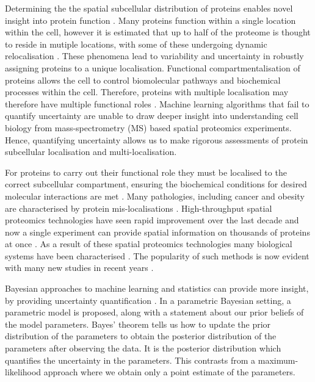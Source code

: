 \documentclass[9pt,a4paper,]{extarticle}
\begin{document}
Determining the the spatial subcellular distribution of
proteins enables novel insight into protein function
\citep{Crook:2018}. Many proteins function within a single location within the
cell, however it is estimated that up to half of the proteome is thought to
reside in mutiple locations, with some of these undergoing
dynamic relocalisation \citep{Thul:2017}. These phenomena lead
to variability and uncertainty in robustly assigning proteins to a unique
localisation. Functional
compartmentalisation of proteins allows the cell to control
biomolecular pathways and biochemical processes within the
cell. Therefore, proteins with multiple localisation may therefore have multiple
functional roles \citep{Jeffery:2009}. Machine learning algorithms that
fail to quantify uncertainty are unable to draw deeper insight into
understanding cell biology from mass-spectrometry (MS) based spatial
proteomics experiments. Hence, quantifying uncertainty allows us to
make rigorous assessments of protein subcellular localisation
and multi-localisation.

For proteins to carry out their functional role they must be localised
to the correct subcellular compartment, ensuring the biochemical conditions
for desired molecular interactions are met \citep{Gibson:2009}. Many
pathologies, including cancer and obesity are characterised by protein
mis-localisations \citep{Olkkonen:2006, Laurila:2009, Luheshi:2008, De:2011, Cody:2013, Kau:2004, Rodriguez:2004, Latorre:2005, Shin:2013, Siljee:2018}.
High-throughput spatial proteomics technologies have seen rapid improvement
over the last decade and now a single experiment can provide spatial information on
thousands of proteins at once \citep{Dunkley:2006, Foster:2006, hyper, DC:2018}.
As a result of these spatial proteomics technologies many biological systems have
been characterised \citep{Dunkley:2006, Tan:2009, Hall:2009, Breckels:2013, hyper, Thul:2017}.
The popularity of such methods is now evident with many new studies in recent years
\citep{hyper, Beltran:2016, Jadot:2017, Itzhak:2017, Mendes:2017, Hirst:2018, Davies:2018, Orre:2019, Nightingale:2019}.

Bayesian approaches to machine learning and statistics can
provide more insight, by providing uncertainty quantification
\citep{Gelman:1995}. In a parametric Bayesian setting, a parametric model
is proposed, along with a statement about our prior beliefs
of the model parameters. Bayes' theorem tells us how to update the
prior distribution of the parameters to obtain the posterior
distribution of the parameters after observing the data. It is the
posterior distribution which quantifies the uncertainty in the
parameters. This contrasts from a maximum-likelihood approach where we obtain only a
point estimate of the parameters.
\end{document}
